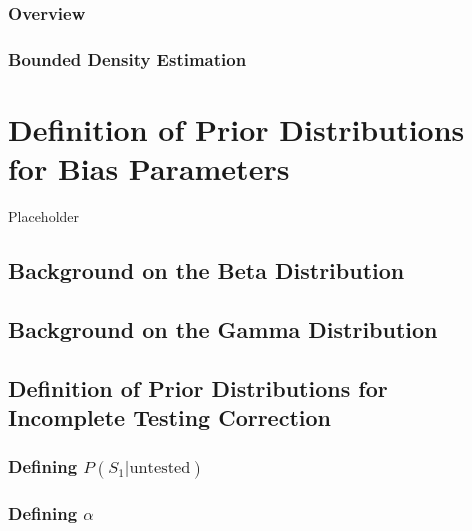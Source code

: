 \documentclass[12pt,twoside]{smiththesis}
\begin{document}
\hypertarget{overview-1}{%
\subsection{Overview}\label{overview-1}}

\hypertarget{bounded-density-estimation}{%
\subsection{Bounded Density Estimation}\label{bounded-density-estimation}}

\hypertarget{defpriors}{%
\chapter{Definition of Prior Distributions for Bias Parameters}\label{defpriors}}

Placeholder

\hypertarget{background-on-the-beta-distribution}{%
\section{Background on the Beta Distribution}\label{background-on-the-beta-distribution}}

\hypertarget{background-on-the-gamma-distribution}{%
\section{Background on the Gamma Distribution}\label{background-on-the-gamma-distribution}}

\hypertarget{definition-of-prior-distributions-for-incomplete-testing-correction}{%
\section{Definition of Prior Distributions for Incomplete Testing Correction}\label{definition-of-prior-distributions-for-incomplete-testing-correction}}

\hypertarget{defining-ps_1textuntested}{%
\subsection{\texorpdfstring{Defining \(P(S_1|\text{untested})\)}{Defining P(S\_1\textbar\textbackslash text\{untested\})}}\label{defining-ps_1textuntested}}

\hypertarget{defining-alpha}{%
\subsection{\texorpdfstring{Defining \(\alpha\)}{Defining \textbackslash alpha}}\label{defining-alpha}}
\end{document}
